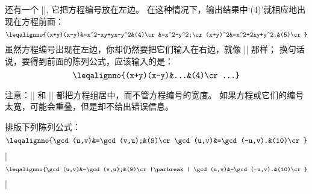 还有一个 |\leqalignno|, 它把方程编号放在左边。%
在这种情况下，输出结果中`(4)'就相应地出现在方程前面：
$$\leqalignno{(x+y)(x-y)&=x^2-xy+yx-y^2&(4)\cr
    &=x^2-y^2;\cr
  (x+y)^2&=x^2+2xy+y^2.&(5)\cr}$$
虽然方程编号出现在左边，你却仍然要把它们输入在右边，就像 |\leqno| 那样；
换句话说，要得到前面的陈列公式，应该输入的是：
\begintt
$$\leqalignno{(x+y)(x-y)&...&(4)\cr...}$$
\endtt

注意：|\eqalignno| 和 |\leqalignno| 都把方程组居中，而不管方程编号的宽度。%
如果方程或它们的编号太宽，可能会重叠，但是却不给出错误信息。

\exercise 排版下列陈列公式：
$$\leqalignno{\gcd(u,v)&=\gcd(v,u);&(9)\cr
    \gcd(u,v)&=\gcd(-u,v).&(10)\cr}$$ %
\answer |$$\leqalignno{\gcd(u,v)&=\gcd(v,u);&(9)\cr|\parbreak
        |    \gcd(u,v)&=\gcd(-u,v).&(10)\cr}$$|

